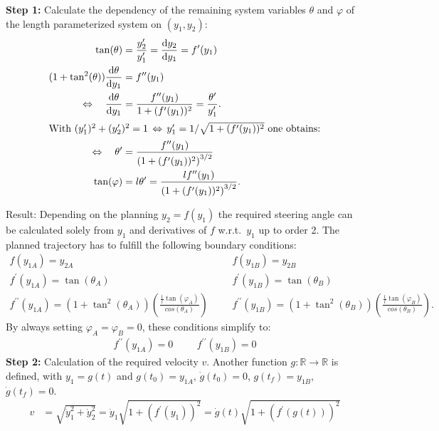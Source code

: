 \documentclass[a4paper,12pt,headinclude=true,headsepline,parskip=half,DIV=12]{scrartcl}
\newcommand{\yIZ}{y_{1A}}
\newcommand{\yIIZ}{y_{2A}}
\newcommand{\yIT}{y_{1B}}
\newcommand{\yIIT}{y_{2B}}
\newcommand{\diff}[2]{\frac{\text{d}#1}{\text{d}#2}}
\begin{document}
\textbf{Step 1:} Calculate the dependency of the remaining system variables $\theta$ and $\varphi$ of the  length parameterized system on $(y_1, y_2)$:
\begin{align}
  \tan(\theta) & = \frac{y_2^\prime}{y_1^\prime} = \diff{y_2}{y_1} = f^\prime(y_1)\\
  (1 + \tan^2(\theta))\diff{\theta}{y_1} & = f^{\prime\prime}(y_1) \nonumber                                                                  \\
  \Leftrightarrow \quad \diff{\theta}{y_1} & = \frac{f^{\prime\prime}(y_1)}{1 + (f^\prime(y_1))^2} = \frac{\theta^\prime}{y_1^\prime}. \nonumber \\
  \intertext{With $(y_1^\prime)^2 + (y_2^\prime)^2 = 1 \, \Leftrightarrow \, y_1^\prime = 1/\sqrt{1 + (f^\prime(y_1))^2}$ one obtains:}
  \Leftrightarrow \quad \theta^\prime  & = \frac{f^{\prime\prime}(y_1)}{\left(1 + (f^\prime(y_1))^2\right)^{3/2}}\\
  \tan(\varphi)  & = l\theta^\prime = \frac{lf^{\prime\prime}(y_1)}{\left(1 + (f^\prime(y_1))^2\right)^{3/2}}.
\end{align}

Result: Depending on the planning $y_2 = f(y_1)$ the required steering angle can be calculated solely from $y_1$ and derivatives of $f$ w.r.t.~$y_1$ up to order 2. The planned trajectory has to fulfill the following boundary conditions:
\begin{align*}
  f(\yIZ) = \yIIZ  &  &  & f(\yIT) = \yIIT \\
  f^\prime(\yIZ) = \tan(\theta_A) &  &  & f^\prime(\yIT) = \tan(\theta_B) \\
  f^{\prime\prime}(\yIZ) = (1+\tan^2(\theta_A))\left(\frac{\frac{1}{l}\tan(\varphi_A)}{cos(\theta_A)}\right) &  &  &
  f^{\prime\prime}(\yIT) = (1+\tan^2(\theta_B))\left(\frac{\frac{1}{l}\tan(\varphi_B)}{cos(\theta_B)}\right).
\end{align*}
By always setting $\varphi_A=\varphi_B=0$, these conditions simplify to:
\begin{align*}
  f^{\prime\prime}(\yIZ) = 0 &  &  & f^{\prime\prime}(\yIT) = 0
\end{align*}
\textbf{Step 2:} Calculation of the required velocity $v$. Another function $g: \mathbb{R} \to \mathbb{R}$ is defined, with $y_1 = g(t)$ and $g(t_0) = \yIZ$, $\dot g(t_0) = 0$, $g(t_f) = \yIT$, $\dot g(t_f) = 0$.
\begin{align}
  v & = \sqrt{\dot y_1^2 + \dot y_2^2} = \dot y_1\sqrt{1 + (f^\prime(y_1))^2} = \dot g(t) \sqrt{1 + (f^\prime(g(t)))^2}
\end{align}
\end{document}
